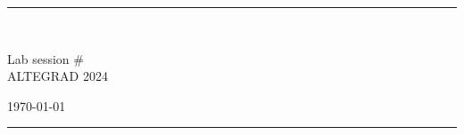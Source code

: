 \fancyhead[C]{}
\hrule \medskip
\begin{minipage}{0.295\textwidth} 
\raggedright
\footnotesize
\yourname \hfill\\
\youremail
\end{minipage}
\begin{minipage}{0.4\textwidth} 
\centering 
\large 
Lab session \# \assignmentnumber\\ 
\normalsize 
ALTEGRAD 2024\\ 
\end{minipage}
\begin{minipage}{0.295\textwidth} 
\raggedleft
\today\hfill\\
\end{minipage}
\medskip\hrule 
\bigskip